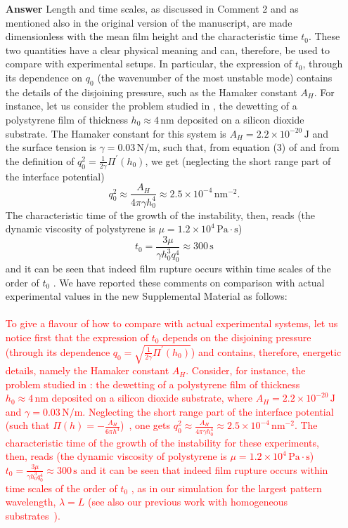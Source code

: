 \documentclass[12pt,english]{article}
\begin{document}
\begin{itemize}
\item[ \textbf{{Answer}}]
{
Length and time scales, as discussed in Comment 2 and as mentioned also in the original version of the manuscript, 
are made dimensionless with the mean film height and the characteristic time $t_0$. 
These two quantities 
have a clear physical meaning and can, therefore, be used to compare with 
experimental setups. In particular, the expression of $t_0$, through its dependence 
on $q_0$ (the wavenumber of the most unstable mode) contains the details 
of the disjoining pressure, such as the Hamaker constant $A_H$. For instance, let us consider the problem studied in \cite{becker2003complex}, the dewetting of a polystyrene film of thickness $h_0 \approx 4 \, \text{nm}$ deposited on a silicon 
dioxide substrate. The Hamaker constant for this system is 
$A_H  = 2.2 \times 10^{-20} \, \text{J}$ and the surface tension is 
$\gamma = 0.03 \, \text{N}/\text{m}$, such that, 
from equation (3) of \cite{becker2003complex} and 
from the definition of $q_0^2 = \frac{1}{2\gamma} \Pi^{\prime}(h_0)$, 
we get (neglecting the short range part of the interface potential)
$$
q_0^2 \approx \frac{A_H}{4\pi \gamma h_0^4} \approx 2.5 \times 10^{-4} \, \text{nm}^{-2}.
$$
The characteristic time of the growth of the instability, then, reads \cite{PhysRevLett.99.114503} (the dynamic viscosity of polystyrene is 
$\mu = 1.2 \times 10^4 \, \text{Pa} \cdot \text{s}$)
$$
t_0 = \frac{3\mu}{\gamma h_0^3 q_0^4} \approx 300 \, \text{s}
$$
and it can be seen that indeed film rupture occurs within time 
scales of the order of $t_0$ \cite{becker2003complex}.
We have reported these comments on comparison with actual experimental 
values in the new Supplemental Material as follows:\\
\\
\textcolor{red}{To give a flavour of how to compare with actual experimental systems, let us notice
first that the expression of $t_0$ depends on the disjoining pressure (through its dependence 
 $q_0 = \sqrt{\frac{1}{2\gamma} \Pi^{\prime}(h_0)}$) and contains, therefore, energetic details, namely 
 the Hamaker constant $A_H$. Consider, for instance, the problem studied in \cite{becker2003complex}: the dewetting of a polystyrene film of thickness $h_0 \approx 4 \, \text{nm}$ deposited on a silicon 
dioxide substrate, where $A_H  = 2.2 \times 10^{-20} \, \text{J}$ and 
$\gamma = 0.03 \, \text{N}/\text{m}$. Neglecting the short range part of the interface potential
(such that $\Pi(h)= - \frac{A_H}{6\pi h^3}$)~\cite{Mecke_2005,becker2003complex}, one gets 
$q_0^2 \approx \frac{A_H}{4\pi \gamma h_0^4} \approx 2.5 \times 10^{-4} \, \text{nm}^{-2}$.
The characteristic time of the growth of the instability for these experiments, then, reads \cite{PhysRevLett.99.114503} (the dynamic viscosity of polystyrene is 
$\mu = 1.2 \times 10^4 \, \text{Pa} \cdot \text{s}$) $t_0 = \frac{3\mu}{\gamma h_0^3 q_0^4} \approx 300 \, \text{s}$ and it can be seen that indeed film rupture occurs within time 
scales of the order of $t_0$ \cite{becker2003complex}, as in our 
simulation for the largest pattern wavelength, $\lambda = L$ (see also our previous work
with homogeneous substrates~\cite{PhysRevE.104.034801}).} 
\\

}
\end{itemize}
\end{document}
